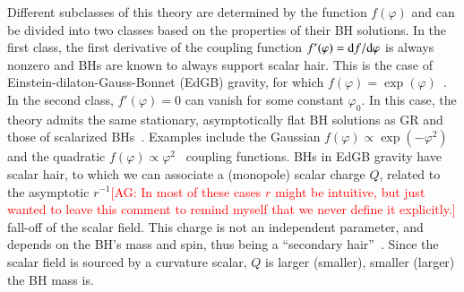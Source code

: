 \documentclass[twocolumn,
               prd,
               aps,
               superscriptaddress,
               tightenlines,
               nofootinbib,
               eqsecnum,
               amsfonts,
               amsmath,
               longbibliography]{revtex4-1}
\newcommand{\dd}{{\rm d}}
\newcommand{\agcomm}[1]{{\textcolor{red}{{[AG: #1]}} }}
\begin{document}
Different subclasses of this theory are determined by the function $f(\varphi)$
and can be divided into two classes based on the properties of their BH
solutions.
%
In the first class, the first derivative of the coupling function $f'(\varphi) = \dd f  / \dd \varphi$
is always nonzero and BHs are known to always support scalar hair.
%
This is the case of Einstein-dilaton-Gauss-Bonnet (EdGB) gravity, for which $f(\varphi) = \exp(\varphi)$~\cite{Kanti:1995vq}.
%
%
In the second class, $f'(\varphi) = 0$ can vanish for some constant $\varphi_0$.
%
In this case, the theory admits the same stationary, asymptotically flat BH
solutions as GR and those of scalarized BHs~\cite{Doneva:2017bvd,Silva:2017uqg,Macedo:2019sem,Dima:2020yac,Herdeiro:2020wei,Berti:2020kgk}.
%
Examples include the Gaussian $f(\varphi) \propto \exp(-\varphi^2)$~\cite{Doneva:2017bvd} and
the quadratic $f(\varphi) \propto \varphi^2$~\cite{Silva:2017uqg} coupling functions.
BHs in EdGB gravity have scalar hair, to which we can associate a (monopole) scalar charge $Q$,
related to the asymptotic $r^{-1}$\agcomm{In most of these cases $r$ might be intuitive, but just wanted to leave this comment to remind myself that we never define it explicitly.} fall-off of the scalar field. 
%
This charge is not an independent parameter, and depends on the BH's mass and spin, %
thus being a ``secondary hair''~\cite{Coleman:1991ku,Herdeiro:2015waa}.
%
Since the scalar field is sourced by a curvature scalar, $Q$ is larger (smaller), 
 smaller (larger) the BH mass is.
\end{document}
